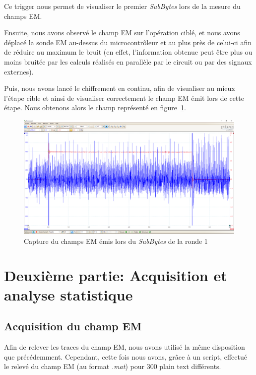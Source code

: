 \documentclass[a4paper, 12pt]{article}
\begin{document}
Ce trigger nous permet de visualiser le premier \emph{SubBytes} lors de la mesure du champs EM. 

Ensuite, nous avons observé le champ EM sur l'opération ciblé, et nous avons déplacé la sonde EM au-dessus du microcontrôleur et au plus près de celui-ci afin de réduire au maximum le bruit (en effet, l'information obtenue peut être plus ou moins bruitée par les calculs réalisés en parallèle par le circuit ou par des signaux externes).

Puis, nous avons lancé le chiffrement en continu, afin de visualiser au mieux l'étape cible et ainsi de visualiser correctement le champ EM émit lors de cette étape. Nous obtenons alors le champ représenté en figure~\ref{subbytes_capture_pico}.
		\begin{figure}[H]
			\begin{center}
			\includegraphics[scale=0.3]{images/subbytes_capture_pico.PNG}
			\end{center}
			\caption{Capture du champs EM émis lors du \emph{SubBytes} de la ronde 1}
			\label{subbytes_capture_pico}
		\end{figure}

\newpage
\section{Deuxième partie: Acquisition et analyse statistique}
	\subsection{Acquisition du champ EM}
	Afin de relever les traces du champ EM, nous avons utilisé la même disposition que précédemment. Cependant, cette fois nous avons, grâce à un script, effectué le relevé du champ EM (au format \emph{.mat}) pour 300 plain text différents. 
	
\end{document}
